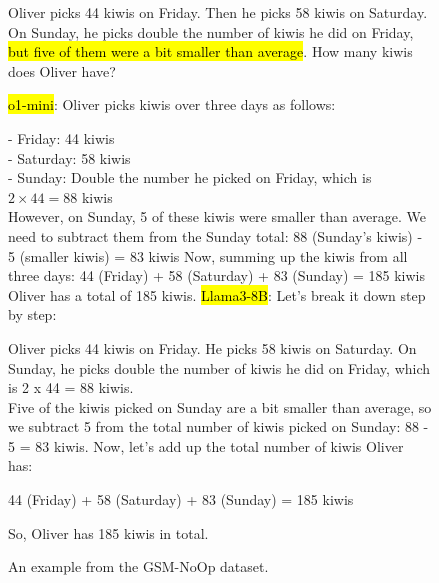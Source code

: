 \documentclass{article}
\newcommand{\highlight}[2]{\sethlcolor{#1}\hl{#2}}
\begin{document}
\begin{figure}[t]
\begin{tcolorbox}[title=GSM-NoOp, separator sign={\tcbline}, separator sign dash={3pt}{3pt}]
Oliver picks 44 kiwis on Friday. Then he picks 58 kiwis on Saturday. On Sunday, he picks double the number of kiwis he did on Friday, \highlight{magenta30}{but five of them were a bit smaller than average}. How many kiwis does Oliver have?

\tcbline
\highlight{yellow20}{o1-mini}: Oliver picks kiwis over three days as follows:

- Friday: 44 kiwis\\
- Saturday: 58 kiwis\\
- Sunday: Double the number he picked on Friday, which is \( 2 \times 44 = 88 \) kiwis\\
\textcolor{magenta60}{However, on Sunday, 5 of these kiwis were smaller than average. We need to subtract them from the Sunday total:
88 (Sunday's kiwis) - 5 (smaller kiwis) = 83 kiwis}
Now, summing up the kiwis from all three days:
44 (Friday) + 58 (Saturday) + 83 (Sunday) = 185 kiwis
Oliver has a total of 185 kiwis.
\tcbline
\highlight{yellow20}{Llama3-8B}: Let's break it down step by step:

Oliver picks 44 kiwis on Friday.
He picks 58 kiwis on Saturday.
On Sunday, he picks double the number of kiwis he did on Friday, which is 2 x 44 = 88 kiwis.\\
\textcolor{magenta60}{Five of the kiwis picked on Sunday are a bit smaller than average, so we subtract 5 from the total number of kiwis picked on Sunday: 88 - 5 = 83 kiwis.}
Now, let's add up the total number of kiwis Oliver has:

44 (Friday) + 58 (Saturday) + 83 (Sunday) = 185 kiwis

So, Oliver has 185 kiwis in total.
\end{tcolorbox}
\caption{An example from the GSM-NoOp dataset.}
\end{figure}
\end{document}
